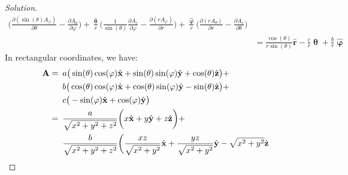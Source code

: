 \documentclass[crop=false,class=article,oneside]{standalone}
\begin{document}
\begin{proof}[Solution]
\begin{align*}
                \bigg(
                    \frac{\partial(\sin(\theta)A_{\varphi})}
                         {\partial\theta}
                    -\frac{\partial{A_{\theta}}}
                          {\partial \varphi}
                \bigg)
                +\frac{\hat{\boldsymbol{\uptheta}}}{r}
                \bigg(
                    \frac{1}{\sin(\theta)}
                    \frac{\partial{A_{r}}}{\partial\varphi}
                    -\frac{\partial(rA_{\varphi})}{\partial{r}}
                \bigg)
                +\frac{\hat{\boldsymbol{\upvarphi}}}{r}
                \bigg(
                    \frac{\partial(rA_{\theta})}{\partial{r}}
                    -\frac{\partial{A_{r}}}{\partial\theta}
                \bigg)\\
                &=\frac{\cos(\theta)}{r\sin(\theta)}\hat{\mathbf{r}}
                -\frac{c}{r}\hat{\boldsymbol{\uptheta}}
                +\frac{b}{r}\hat{\boldsymbol{\upvarphi}}
            \end{align*}
            In rectangular coordinates, we have:
            \begin{align*}
                \mathbf{A}=\hspace{0.5em}
                &a\big(\sin(\theta)\cos(\varphi)
                 \hat{\mathbf{x}}
                +\sin(\theta)\sin(\varphi)
                 \hat{\mathbf{y}}
                +\cos(\theta)\hat{\mathbf{z}}\big)+\\
                &b\big(
                    \cos(\theta)\cos(\varphi)
                    \hat{\mathbf{x}}
                    +\cos(\theta)\sin(\varphi)
                    \hat{\mathbf{y}}
                    -\sin(\theta)\hat{\mathbf{z}}
                \big)+\\
                &c\big(
                    -\sin(\varphi)\hat{\mathbf{x}}
                    +\cos(\varphi)\hat{\mathbf{y}}
                \big)\\
                =\hspace{0.5em}
                &\frac{a}{\sqrt{x^{2}+y^{2}+z^{2}}}
                \bigg(
                    x\hat{\mathbf{x}}
                    +y\hat{\mathbf{y}}
                    +z\hat{\mathbf{z}}
                \bigg)+\\
                &\frac{b}{\sqrt{x^{2}+y^{2}+z^{2}}}
                \bigg(
                    \frac{xz}{\sqrt{x^{2}+y^{2}}}
                    \hat{\mathbf{x}}
                    +\frac{yz}{\sqrt{x^{2}+y^{2}}}
                    \hat{\mathbf{y}}
                    -\sqrt{x^{2}+y^{2}}\hat{\mathbf{z}}

\end{align*}
\end{proof}
\end{document}
